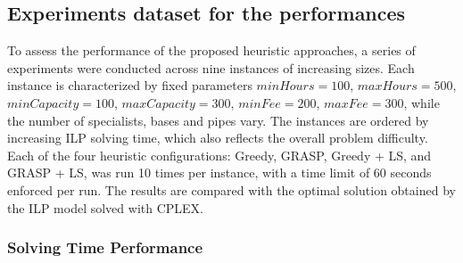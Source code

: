 \documentclass{article}
\begin{document}

\subsection{Experiments dataset for the performances}

To assess the performance of the proposed heuristic approaches, a series of experiments were conducted across nine instances of increasing sizes. Each instance is characterized by fixed parameters $minHours = 100$, $maxHours = 500$, $minCapacity = 100$, $maxCapacity = 300$, $minFee = 200$, $maxFee = 300$, while the number of specialists, bases and pipes vary. The instances are ordered by increasing ILP solving time, which also reflects the overall problem difficulty.
Each of the four heuristic configurations: Greedy, GRASP, Greedy + LS, and GRASP + LS, was run 10 times per instance, with a time limit of 60 seconds enforced per run. The results are compared with the optimal solution obtained by the ILP model solved with CPLEX.

\subsubsection{Solving Time Performance}
\end{document}

